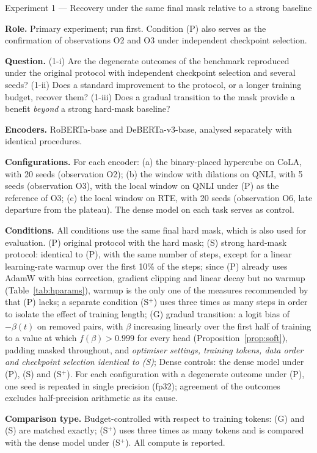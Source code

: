 \documentclass[10pt]{article}
\newcommand{\cardfield}[1]{\par\smallskip\noindent\textbf{#1.}\enspace}
\begin{document}
\begin{expcard}{Experiment 1 --- Recovery under the same final mask relative to a strong baseline}
\cardfield{Role} Primary experiment; run first. Condition (P) also serves as the confirmation of observations O2 and O3 under independent checkpoint selection.
\cardfield{Question} (1-i) Are the degenerate outcomes of the benchmark reproduced under the original protocol with independent checkpoint selection and several seeds? (1-ii) Does a standard improvement to the protocol, or a longer training budget, recover them? (1-iii) Does a gradual transition to the mask provide a benefit \emph{beyond} a strong hard-mask baseline?
\cardfield{Encoders} RoBERTa-base and DeBERTa-v3-base, analysed separately with identical procedures.\cardfield{Configurations} For each encoder: (a) the binary-placed hypercube on CoLA, with 20 seeds (observation O2); (b) the window with dilations on QNLI, with 5 seeds (observation O3), with the local window on QNLI under (P) as the reference of O3; (c) the local window on RTE, with 20 seeds (observation O6, late departure from the plateau). The dense model on each task serves as control.
\cardfield{Conditions} All conditions use the same final hard mask, which is also used for evaluation.
(P) original protocol with the hard mask;
(S) strong hard-mask protocol: identical to (P), with the same number of steps, except for a linear learning-rate warmup over the first 10\% of the steps; since (P) already uses AdamW with bias correction, gradient clipping and linear decay but no warmup (Table~\ref{tab:hparams}), warmup is the only one of the measures recommended by \citet{mosbach2021stability} that (P) lacks; a separate condition (S$^{+}$) uses three times as many steps in order to isolate the effect of training length;
(G) gradual transition: a logit bias of $-\beta(t)$ on removed pairs, with $\beta$ increasing linearly over the first half of training to a value at which $f(\beta)>0.999$ for every head (Proposition~\ref{prop:soft}), padding masked throughout, and \emph{optimiser settings, training tokens, data order and checkpoint selection identical to (S)};
Dense controls: the dense model under (P), (S) and (S$^{+}$). For each configuration with a degenerate outcome under (P), one seed is repeated in single precision (fp32); agreement of the outcomes excludes half-precision arithmetic as its cause.
\cardfield{Comparison type} Budget-controlled with respect to training tokens: (G) and (S) are matched exactly; (S$^{+}$) uses three times as many tokens and is compared with the dense model under (S$^{+}$). All compute is reported.

\end{expcard}
\end{document}
